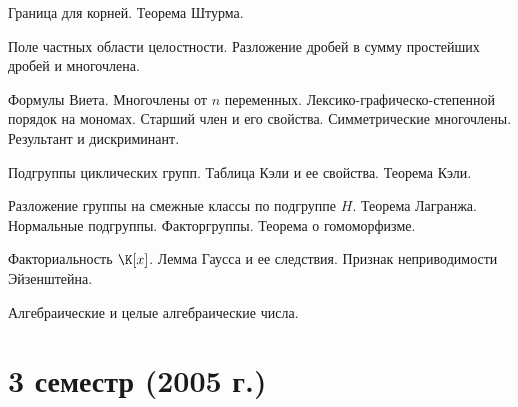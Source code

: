 \documentclass[a4paper]{article}
\begin{document}
\begin{nums}{0}
Граница для корней. Теорема Штурма.
\item Поле частных области целостности. Разложение дробей в сумму простейших дробей и многочлена.
\item Формулы Виета. Многочлены от $n$ переменных. Лексико-графическо-степенной порядок на мономах.
Старший член и его свойства. Симметрические многочлены. Результант и дискриминант.
\item Подгруппы циклических групп. Таблица Кэли и ее свойства. Теорема Кэли.
\item Разложение группы на смежные классы по подгруппе $H$. Теорема Лагранжа. Нормальные подгруппы.
Факторгруппы. Теорема о гомоморфизме.
\item Факториальность $\K[x]$. Лемма Гаусса и ее следствия. Признак неприводимости Эйзенштейна.
\item Алгебраические и целые алгебраические числа.
\end{nums}
\pagebreak

\section*{3 семестр (2005 г.)}
\end{document}
